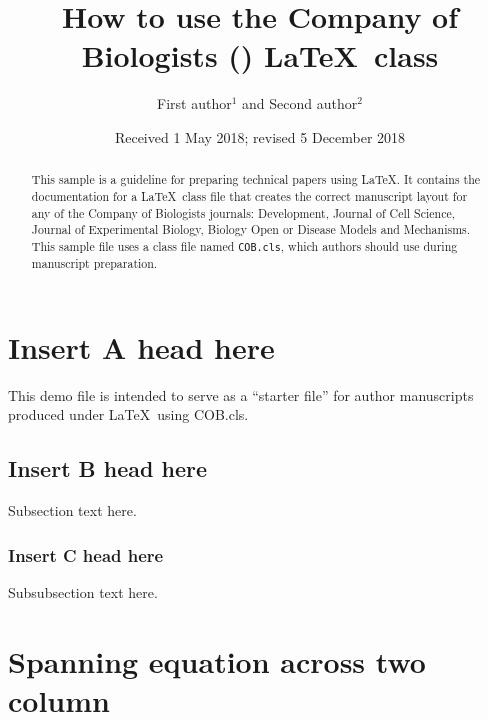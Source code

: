 \documentclass[vruler,JEB]{COB}%
\begin{document}

\title{How to use the Company of Biologists (\JABBR) \LaTeX\ class}

\author{First author$^{1}$ and Second author$^{2}$}

\address{
}


\date{Received 1 May 2018; revised 5 December 2018}

\maketitle

\begin{abstract}
This sample is a guideline for preparing technical papers
using \LaTeX. It contains the documentation for a \LaTeX\
class file that creates the correct manuscript layout for
any of the Company of Biologists journals: Development,
Journal of Cell Science, Journal of Experimental Biology,
Biology Open or Disease Models and Mechanisms. This sample
file uses a class file named \texttt{COB.cls}, which authors should
use during manuscript preparation.
\end{abstract}



\section{Insert A head here}
This demo file is intended to serve as a ``starter file''
for author manuscripts produced under \LaTeX\ using
COB.cls.

\subsection{Insert B head here}
Subsection text here.


\subsubsection{Insert C head here}
Subsubsection text here.

\section{Spanning equation across two column}
\end{document}
